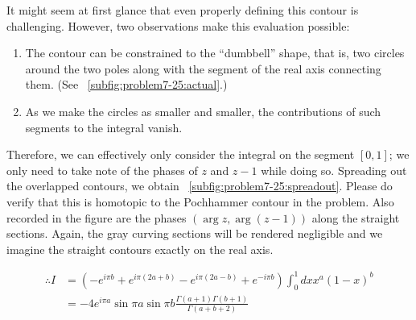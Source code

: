 It might seem at first glance that even properly defining this contour is challenging.
However, two observations make this evaluation possible:
\begin{enumerate}
    \item The contour can be constrained to the ``dumbbell'' shape,
    that is, two circles around the two poles
    along with the segment of the real axis connecting them.
    (See ~\ref{subfig:problem7-25:actual}.)
    \item As we make the circles as smaller and smaller,
    the contributions of such segments to the integral vanish.
\end{enumerate}
Therefore, we can effectively only consider the integral on the segment $[0, 1]$;
we only need to take note of the phases of $z$ and $z - 1$ while doing so.
Spreading out the overlapped contours, we obtain ~\ref{subfig:problem7-25:spreadout}.
Please do verify that this is homotopic to the Pochhammer contour in the problem.
Also recorded in the figure are the phases $(\arg z, \arg (z - 1))$ along the straight sections.
Again, the gray curving sections will be rendered negligible
and we imagine the straight contours exactly on the real axis.

\begin{align*}
    \therefore I
    &= \left(
        -e^{i\pi b} + e^{i\pi (2a + b)} - e^{i\pi (2a - b)} + e^{-i\pi b}
    \right) \int_0^1 dx x^a {(1 - x)}^b \\
    &= -4e^{i\pi a} \sin \pi a \sin \pi b
       \frac{\Gamma(a + 1) \Gamma(b + 1)}{\Gamma(a + b + 2)}
\end{align*}
